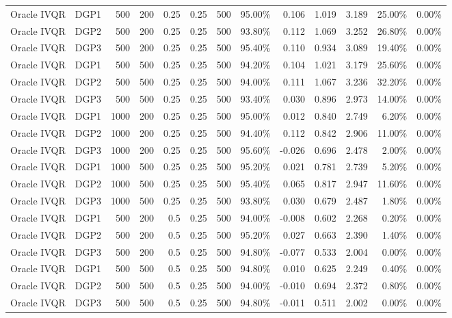 \begin{landscape}
\begin{longtable}{llrrrrrrrrrrr}
Oracle IVQR & DGP1 & 500 & 200 & 0.25 & 0.25 & 500 & 95.00\% & 0.106 & 1.019 & 3.189 & 25.00\% & 0.00\% \\
Oracle IVQR & DGP2 & 500 & 200 & 0.25 & 0.25 & 500 & 93.80\% & 0.112 & 1.069 & 3.252 & 26.80\% & 0.00\% \\
Oracle IVQR & DGP3 & 500 & 200 & 0.25 & 0.25 & 500 & 95.40\% & 0.110 & 0.934 & 3.089 & 19.40\% & 0.00\% \\
Oracle IVQR & DGP1 & 500 & 500 & 0.25 & 0.25 & 500 & 94.20\% & 0.104 & 1.021 & 3.179 & 25.60\% & 0.00\% \\
Oracle IVQR & DGP2 & 500 & 500 & 0.25 & 0.25 & 500 & 94.00\% & 0.111 & 1.067 & 3.236 & 32.20\% & 0.00\% \\
Oracle IVQR & DGP3 & 500 & 500 & 0.25 & 0.25 & 500 & 93.40\% & 0.030 & 0.896 & 2.973 & 14.00\% & 0.00\% \\
Oracle IVQR & DGP1 & 1000 & 200 & 0.25 & 0.25 & 500 & 95.00\% & 0.012 & 0.840 & 2.749 & 6.20\% & 0.00\% \\
Oracle IVQR & DGP2 & 1000 & 200 & 0.25 & 0.25 & 500 & 94.40\% & 0.112 & 0.842 & 2.906 & 11.00\% & 0.00\% \\
Oracle IVQR & DGP3 & 1000 & 200 & 0.25 & 0.25 & 500 & 95.60\% & -0.026 & 0.696 & 2.478 & 2.00\% & 0.00\% \\
Oracle IVQR & DGP1 & 1000 & 500 & 0.25 & 0.25 & 500 & 95.20\% & 0.021 & 0.781 & 2.739 & 5.20\% & 0.00\% \\
Oracle IVQR & DGP2 & 1000 & 500 & 0.25 & 0.25 & 500 & 95.40\% & 0.065 & 0.817 & 2.947 & 11.60\% & 0.00\% \\
Oracle IVQR & DGP3 & 1000 & 500 & 0.25 & 0.25 & 500 & 93.80\% & 0.030 & 0.679 & 2.487 & 1.80\% & 0.00\% \\
Oracle IVQR & DGP1 & 500 & 200 & 0.5 & 0.25 & 500 & 94.00\% & -0.008 & 0.602 & 2.268 & 0.20\% & 0.00\% \\
Oracle IVQR & DGP2 & 500 & 200 & 0.5 & 0.25 & 500 & 95.20\% & 0.027 & 0.663 & 2.390 & 1.40\% & 0.00\% \\
Oracle IVQR & DGP3 & 500 & 200 & 0.5 & 0.25 & 500 & 94.80\% & -0.077 & 0.533 & 2.004 & 0.00\% & 0.00\% \\
Oracle IVQR & DGP1 & 500 & 500 & 0.5 & 0.25 & 500 & 94.80\% & 0.010 & 0.625 & 2.249 & 0.40\% & 0.00\% \\
Oracle IVQR & DGP2 & 500 & 500 & 0.5 & 0.25 & 500 & 94.00\% & -0.010 & 0.694 & 2.372 & 0.80\% & 0.00\% \\
Oracle IVQR & DGP3 & 500 & 500 & 0.5 & 0.25 & 500 & 94.80\% & -0.011 & 0.511 & 2.002 & 0.00\% & 0.00\% \\

\end{longtable}
\end{landscape}
